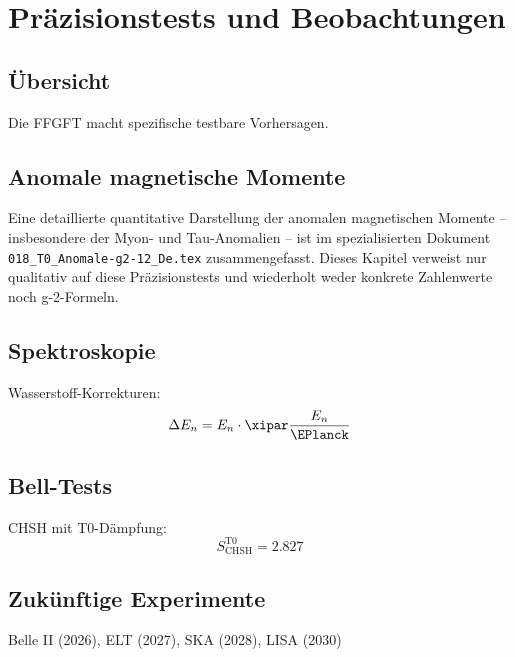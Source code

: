 \chapter{Präzisionstests und Beobachtungen}

\section{Übersicht}
Die FFGFT macht spezifische testbare Vorhersagen.

\section{Anomale magnetische Momente}

Eine detaillierte quantitative Darstellung der anomalen magnetischen Momente – insbesondere der Myon- und Tau-Anomalien – ist im spezialisierten Dokument \texttt{018\_T0\_Anomale-g2-12\_De.tex} zusammengefasst.
Dieses Kapitel verweist nur qualitativ auf diese Präzisionstests und wiederholt weder konkrete Zahlenwerte noch g-2-Formeln.


\section{Spektroskopie}
Wasserstoff-Korrekturen:
\begin{equation}
\Delta E_n = E_n \cdot \xipar \frac{E_n}{\EPlanck}
\end{equation}

\section{Bell-Tests}
CHSH mit T0-Dämpfung:
\begin{equation}
S_{\text{CHSH}}^{\text{T0}} = 2.827
\end{equation}

\section{Zukünftige Experimente}
Belle II (2026), ELT (2027), SKA (2028), LISA (2030)



